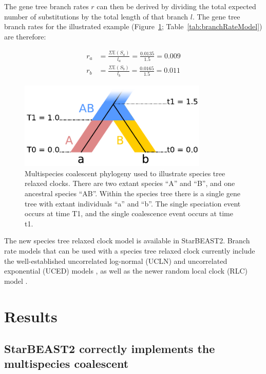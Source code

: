 \documentclass[12pt]{article}
\begin{document}
The gene tree branch rates $r$ can then be derived by dividing the total
expected number of substitutions by the total length of that branch $l$. The
gene tree branch rates for the illustrated example
(Figure~\ref{fig:branchRateModel}; Table~\ref{tab:branchRateModel}) are
therefore:

\begin{align}
r_a &= \frac{\Sigma \mathbb{E}(S_a)}{l_a} = \frac{0.0135}{1.5} = 0.009\\
r_b &= \frac{\Sigma \mathbb{E}(S_b)}{l_b} = \frac{0.0165}{1.5} = 0.011
\end{align}

\begin{figure}[htb!]
\centering
\includegraphics[width=9cm]{relaxed_clock.pdf}
\caption
{Multispecies coalescent phylogeny used to illustrate species tree relaxed
clocks. There are two extant species ``A'' and ``B'', and one ancestral species ``AB''.
Within the species tree there is a single gene tree with extant individuals ``a''
and ``b''. The single speciation event occurs at time T1, and the single coalescence
event occurs at time t1.}
\label{fig:branchRateModel}
\end{figure}

The new species tree relaxed clock model is available in StarBEAST2. Branch rate
models that can be used with a species tree relaxed clock currently include the
well-established uncorrelated log-normal (UCLN) and uncorrelated exponential
(UCED) models \citep{10.1371/journal.pbio.0040088}, as well as the newer random
local clock (RLC) model \citep{Drummond2010}.

\section*{Results}

\subsection*{StarBEAST2 correctly implements the multispecies coalescent}
\end{document}
